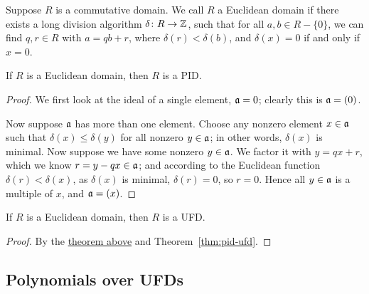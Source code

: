 \begin{definition}
    Suppose \(R\) is a commutative domain.
    We call \(R\) a Euclidean domain if there exists a long division algorithm
    \(\delta\colon R\to\mathbb{Z}\),
    such that for all \(a,b \in R - \{0\}\),
    we can find \(q,r \in R\) with \(a = qb + r\),
    where \(\delta(r) < \delta(b)\),
    and \(\delta(x) = 0\) if and only if \(x = 0\).
\end{definition}
\begin{theorem}\label{thm:euclidean-pid}
    If \(R\) is a Euclidean domain,
    then \(R\) is a PID.\@
\end{theorem}
\begin{proof}
    We first look at the ideal of a single element, \(\mathfrak{a} = 0\);
    clearly this is \(\mathfrak{a} = (0)\).

    Now suppose \(\mathfrak{a}\) has more than one element.
    Choose any nonzero element \(x \in \mathfrak{a}\)
    such that \(\delta(x) \leq \delta(y)\) for all nonzero \(y \in \mathfrak{a}\);
    in other words, \(\delta(x)\) is minimal.
    Now suppose we have some nonzero \(y \in \mathfrak{a}\).
    We factor it with \(y = qx + r\),
    which we know \(r = y - qx \in \mathfrak{a}\);
    and according to the Euclidean function \(\delta(r) < \delta(x)\),
    as \(\delta(x)\) is minimal, \(\delta(r) = 0\), so \(r = 0\).
    Hence all \(y \in \mathfrak{a}\) is a multiple of \(x\),
    and \(\mathfrak{a} = (x)\).
\end{proof}
\begin{corollary}\label{cor:euclidean-ufd}
    If \(R\) is a Euclidean domain,
    then \(R\) is a UFD.\@
\end{corollary}
\begin{proof}
    By the \hyperref[thm:euclidean-pid]{theorem above}
    and Theorem~\ref{thm:pid-ufd}.
\end{proof}

\subsection*{Polynomials over UFDs}

